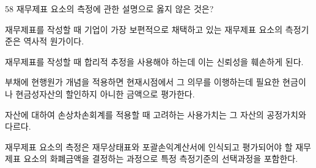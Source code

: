 \begin{question}{58}
재무제표 요소의 측정에 관한 설명으로 옳지 않은 것은?
\begin{choices}
  \item 재무제표를 작성할 때 기업이 가장 보편적으로 채택하고 있는 재무제표 요소의 측정기준은 역사적 원가이다.
  \item 재무제표를 작성할 때 합리적 추정을 사용해야 하는데 이는 신뢰성을 훼손하게 된다.
  \item 부채에 현행원가 개념을 적용하면 현재시점에서 그 의무를 이행하는데 필요한 현금이나 현금성자산의 할인하지 아니한 금액으로 평가한다.
  \item 자산에 대하여 손상차손회계를 적용할 때 고려하는 사용가치는 그 자산의 공정가치와 다르다.
  \item 재무제표 요소의 측정은 재무상태표와 포괄손익계산서에 인식되고 평가되어야 할 재무제표 요소의 화폐금액을 결정하는 과정으로 특정 측정기준의 선택과정을 포함한다.
\end{choices}
\end{question}
